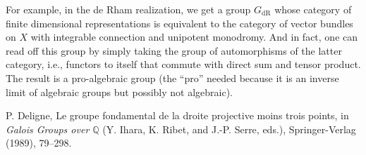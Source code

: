 \documentclass[12pt]{article}
\def\QQ{\mathbb{Q}}
\DeclareMathOperator{\dR}{dR}
\begin{document}
For example, in the de Rham realization, we get a group $G_{\dR}$ whose
category of finite dimensional representations is equivalent to
the category of vector bundles on $X$ with integrable
connection and unipotent monodromy. And in fact, one can read off this
group by simply taking the group of automorphisms of the latter category,
i.e., functors to itself that commute with direct sum and tensor product.
The result is a pro-algebraic group (the ``pro'' needed because it
is an inverse limit of algebraic groups but possibly not algebraic).


\begin{thebibliography}{999}
P. Deligne, Le groupe fondamental de la droite projective moins trois
points, in \textit{Galois Groups over $\QQ$} (Y. Ihara, K. Ribet, and
J.-P. Serre, eds.), Springer-Verlag (1989), 79--298.
\end{thebibliography}
\end{document}
